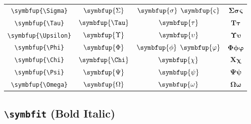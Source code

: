 \documentclass[12pt,a4paper]{article}
\begin{document}
\begin{longtable}{|c|c|c|c|}
\verb|\symbfup{\Sigma}| & $\symbfup{\Sigma}$ & $\symbfup{\sigma}$ $\symbfup{\varsigma}$ & $ 𝚺 𝛔 𝛓 $ \\
\verb|\symbfup{\Tau}| & $\symbfup{\Tau}$ & $\symbfup{\tau}$ & $ 𝚻 𝛕 $ \\
\verb|\symbfup{\Upsilon}| & $\symbfup{\Upsilon}$ & $\symbfup{\upsilon}$ & $ 𝚼 𝛖 $ \\
\verb|\symbfup{\Phi}| & $\symbfup{\Phi}$ & $\symbfup{\phi}$ $\symbfup{\varphi}$ & $ 𝚽 𝛟 𝛗 $ \\
\verb|\symbfup{\Chi}| & $\symbfup{\Chi}$ & $\symbfup{\chi}$ & $ 𝚾 𝛘 $ \\
\verb|\symbfup{\Psi}| & $\symbfup{\Psi}$ & $\symbfup{\psi}$ & $ 𝚿 𝛙 $ \\
\verb|\symbfup{\Omega}| & $\symbfup{\Omega}$ & $\symbfup{\omega}$ & $ 𝛀 𝛚 $ \\
\hline
\end{longtable}

\newpage

\subsection*{\texttt{\textbackslash{}symbfit} (Bold Italic)}
\end{document}
